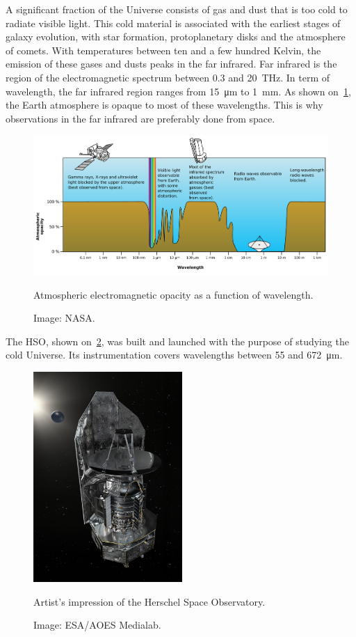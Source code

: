A significant fraction of the Universe consists of gas and dust that is too cold to radiate visible light.
This cold material is associated with the earliest stages of galaxy evolution, with star formation, protoplanetary disks and the atmosphere of comets.
With temperatures between ten and a few hundred Kelvin, the emission of these gases and dusts peaks in the far infrared.
Far infrared is the region of the electromagnetic spectrum between 0.3 and \SI{20}{\tera\hertz}.
In term of wavelength, the far infrared region ranges from \SI{15}{\micro\meter} to \SI{1}{\milli\meter}.
As shown on~\cref{fig:atmospheric_electromagnetic_opacity}, the Earth atmosphere is opaque to most of these wavelengths.
This is why observations in the far infrared are preferably done from space.

\begin{figure}[hbtp]
    \centering
    \includegraphics[width=\textwidth]{atmospheric_electromagnetic_opacity}
    \caption{Atmospheric electromagnetic opacity as a function of wavelength.}
    \caption*{Image: NASA.}
    \label{fig:atmospheric_electromagnetic_opacity}
\end{figure}

The HSO,
shown on~\cref{fig:herschel_spacecraft_artist},
was built and launched with the purpose of studying the cold Universe.
Its instrumentation covers wavelengths between 55 and \SI{672}{\micro\meter}.

\begin{figure}[hbtp]
    \centering
    \includegraphics[height=8cm]{herschel_spacecraft_artist}
    \caption{Artist's impression of the Herschel Space Observatory.}
    \caption*{Image: ESA/AOES Medialab.}
    \label{fig:herschel_spacecraft_artist}
\end{figure}


